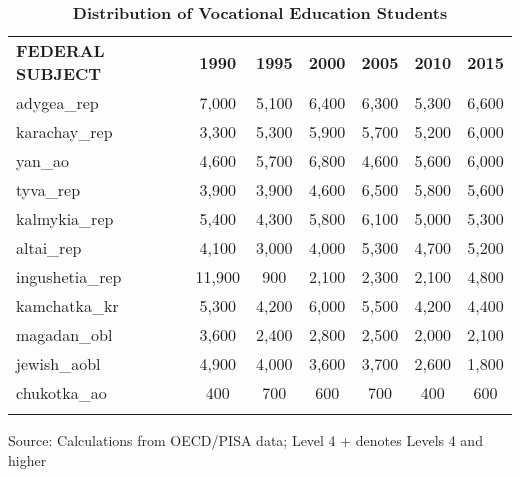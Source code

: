 \documentclass[alpha-refs,fleqn]{wiley-article_p2}
\begin{document}
\setcounter{table}{0} 
\renewcommand{\thetable}{A\arabic{table}}
\smaller
\begin{table}[h]
\caption{\textbf{Distribution of Vocational Education Students}}\label{table:a1}
\begin{threeparttable}
\setlength{\tabcolsep}{5pt}
\renewcommand{\arraystretch}{1.25}
\begin{tabular}{p{5.5cm}cccccc}
\rowcolor{grey!30} 
\textbf{FEDERAL SUBJECT}	&	\textbf{1990}	&	\textbf{1995}	&	\textbf{2000}	&	\textbf{2005}	&	\textbf{2010}	&	\textbf{2015} 	\\
adygea\_rep	&	7,000	&	5,100	&	6,400	&	6,300	&	5,300	&	6,600	\\
karachay\_rep	&	3,300	&	5,300	&	5,900	&	5,700	&	5,200	&	6,000	\\
yan\_ao	&	4,600	&	5,700	&	6,800	&	4,600	&	5,600	&	6,000	\\
tyva\_rep	&	3,900	&	3,900	&	4,600	&	6,500	&	5,800	&	5,600	\\
kalmykia\_rep	&	5,400	&	4,300	&	5,800	&	6,100	&	5,000	&	5,300	\\
altai\_rep	&	4,100	&	3,000	&	4,000	&	5,300	&	4,700	&	5,200	\\
ingushetia\_rep	&	11,900	&	900	&	2,100	&	2,300	&	2,100	&	4,800	\\
kamchatka\_kr	&	5,300	&	4,200	&	6,000	&	5,500	&	4,200	&	4,400	\\
magadan\_obl	&	3,600	&	2,400	&	2,800	&	2,500	&	2,000	&	2,100	\\
jewish\_aobl	&	4,900	&	4,000	&	3,600	&	3,700	&	2,600	&	1,800	\\
chukotka\_ao	&	400	&	700	&	600	&	700	&	400	&	600	\\
 	&	\hspace{4em}	&	\hspace{4em}	&	\hspace{4em}	&	\hspace{4em} &	\hspace{4em} &	\hspace{4em}	\\
\hline  %
\end{tabular}
\begin{tablenotes}
\item Source: Calculations from OECD/PISA data; Level 4 + denotes Levels 4 and higher
\end{tablenotes}
\end{threeparttable}
\vspace{4in}
\end{table}
\end{document}
